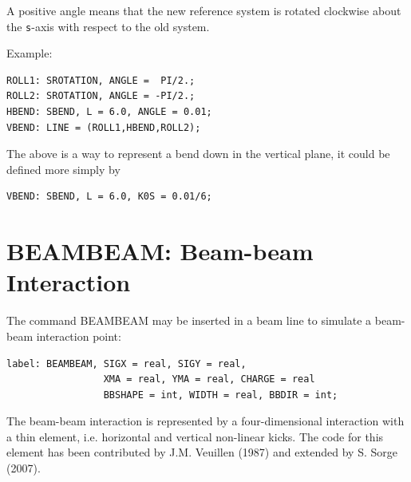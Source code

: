 A positive angle means that the new reference system is rotated
clockwise about the \texttt{s}-axis with respect to the old system.  

Example: 
\begin{verbatim}
ROLL1: SROTATION, ANGLE =  PI/2.;
ROLL2: SROTATION, ANGLE = -PI/2.;
HBEND: SBEND, L = 6.0, ANGLE = 0.01;
VBEND: LINE = (ROLL1,HBEND,ROLL2);
\end{verbatim} 
The above is a way to represent a bend down in the vertical plane, it could be defined more simply by 
\begin{verbatim}
VBEND: SBEND, L = 6.0, K0S = 0.01/6;
\end{verbatim}



%
\section{BEAMBEAM: Beam-beam Interaction}
The command BEAMBEAM may be inserted in a beam line to simulate a
beam-beam interaction point:  
 
\begin{verbatim}
label: BEAMBEAM, SIGX = real, SIGY = real,
                 XMA = real, YMA = real, CHARGE = real
                 BBSHAPE = int, WIDTH = real, BBDIR = int;
\end{verbatim}

The beam-beam interaction is represented by a four-dimensional
interaction with a thin element, i.e. horizontal and vertical non-linear kicks.
The code for this element has been contributed by J.M. Veuillen (1987)
and extended by S. Sorge (2007).  
 
